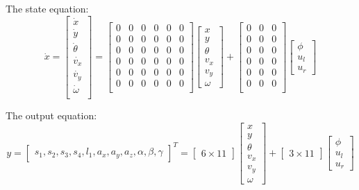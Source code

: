 \noindent The state equation:
\[\dot{x} =
\begin{bmatrix}
	\dot{x}\\ \dot{y}\\ \dot{\theta}\\ \dot{v_x}\\ \dot{v_y}\\ \dot{\omega}\\
\end{bmatrix} = 
\begin{bmatrix}
	0 & 0 & 0 & 0 & 0 & 0 \\
	0 & 0 & 0 & 0 & 0 & 0 \\
	0 & 0 & 0 & 0 & 0 & 0 \\
	0 & 0 & 0 & 0 & 0 & 0 \\
	0 & 0 & 0 & 0 & 0 & 0 \\
	0 & 0 & 0 & 0 & 0 & 0 \\
\end{bmatrix}
\begin{bmatrix}
	x\\ y\\ \theta\\ v_x\\ v_y\\ \omega
\end{bmatrix} + 
\begin{bmatrix}
	0 & 0 & 0\\
	0 & 0 & 0\\
	0 & 0 & 0\\
	0 & 0 & 0\\
	0 & 0 & 0\\
	0 & 0 & 0\\
\end{bmatrix}
\begin{bmatrix}
	\phi\\ u_l\\ u_r
\end{bmatrix}
\]

\noindent The output equation:
\[y =
\begin{bmatrix}
	s_1, s_2, s_3, s_4, l_1, a_x, a_y, a_z, \alpha, \beta, \gamma
\end{bmatrix}^T = 
\begin{bmatrix}
	6\times 11
\end{bmatrix}
\begin{bmatrix}
	x\\ y\\ \theta\\ v_x\\ v_y\\ \omega
\end{bmatrix} + 
\begin{bmatrix}
	3\times 11
\end{bmatrix}
\begin{bmatrix}
	\phi\\ u_l\\ u_r
\end{bmatrix}
\]


